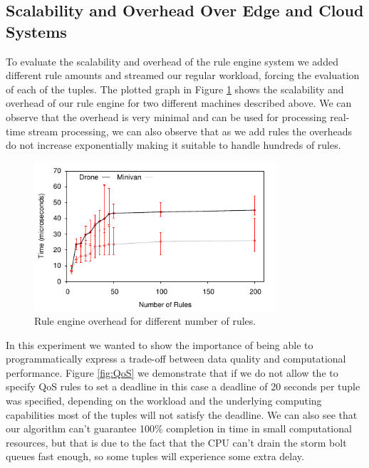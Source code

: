 \subsection{Scalability and Overhead Over Edge and Cloud Systems}

To evaluate the scalability and overhead of the rule engine system we added different rule amounts and streamed our regular workload, forcing the evaluation of each of the tuples. The plotted graph in Figure  \ref{fig:RuleEngine} shows the scalability and overhead of our rule engine for two different machines described above. We can observe that the overhead is very minimal and can be used for processing real-time stream processing, we can also observe that as we add rules the overheads do not increase exponentially making it suitable to handle hundreds of rules.

\begin{figure}[h!]
  \centering
  \includegraphics[width=0.8\textwidth]{Results/RuleEngine}
  \caption{Rule engine overhead for different number of rules.}
  \label{fig:RuleEngine}
\end{figure}

In this experiment we wanted to show the importance of being able to programmatically express a trade-off between data quality and computational performance. Figure \ref{fig:QoS} we demonstrate that if we do not allow the to specify QoS rules to set a deadline in this case a deadline of 20 seconds per tuple was specified, depending on the workload and the underlying computing capabilities most of the tuples will not satisfy the deadline. We can also see that our algorithm can't guarantee 100\% completion in time in small computational resources, but that is due to the fact that the CPU can't drain the storm bolt queues fast enough, so some tuples will experience some extra delay.

